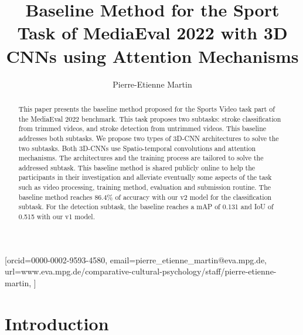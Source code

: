 \documentclass[
]{ceurart}
\begin{document}


\title{Baseline Method for the Sport Task of MediaEval 2022 with 3D CNNs using Attention Mechanisms}
\renewcommand{\shorttitle}{Sport Task}


\author{Pierre-Etienne Martin}[orcid=0000-0002-9593-4580,
    email=pierre_etienne_martin@eva.mpg.de,
    url=www.eva.mpg.de/comparative-cultural-psychology/staff/pierre-etienne-martin,
]







\address{CCP Department, Max Planck Institute for Evolutionary Anthropology, D-04103 Leipzig, Germany}






\begin{abstract}
This paper presents the baseline method proposed for the Sports Video task part of the MediaEval 2022 benchmark. This task proposes two subtasks: stroke classification from trimmed videos, and stroke detection from untrimmed videos. This baseline addresses both subtasks.
We propose two types of 3D-CNN architectures to solve the two subtasks. Both 3D-CNNs use Spatio-temporal convolutions and attention mechanisms. The architectures and the training process are tailored to solve the addressed subtask.
This baseline method is shared publicly online to help the participants in their investigation and alleviate eventually some aspects of the task such as video processing, training method, evaluation and submission routine.
The baseline method reaches 86.4\% of accuracy with our v2 model for the classification subtask. For the detection subtask, the baseline reaches a mAP of 0.131 and IoU of 0.515 with our v1 model.
\end{abstract}

\maketitle

\section{Introduction}
\label{sec:intro}
\end{document}
